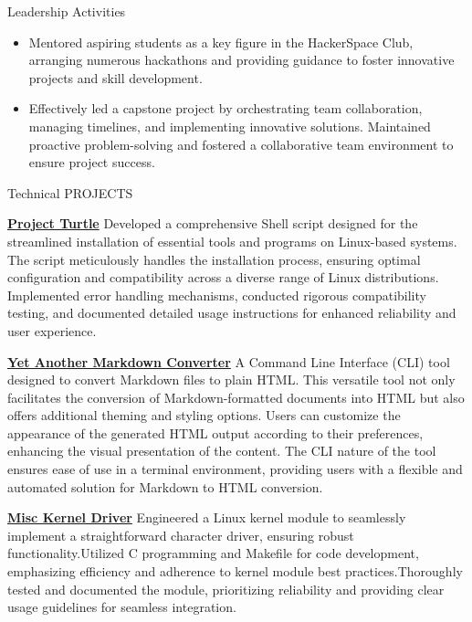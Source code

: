 \documentclass{resume} %
\begin{document}
\begin{rSection}{Leadership Activities} 
\vspace{0.25cm}
\begin{itemize}
    \item Mentored aspiring students as a key figure in the HackerSpace Club, arranging numerous hackathons and providing guidance to foster innovative projects and skill development.
    \item Effectively led a capstone project by orchestrating team collaboration, managing timelines, and implementing innovative solutions. Maintained proactive problem-solving and fostered a collaborative team environment to ensure project success.
\end{itemize}


\end{rSection}
\begin{rSection}{Technical PROJECTS}
\vspace{0.25cm}
\item \textbf{\href{https://github.com/Adarsh-Liju/ProjectTurtle}{Project Turtle}} {Developed a comprehensive Shell script designed for the streamlined installation of essential tools and programs on Linux-based systems. The script meticulously handles the installation process, ensuring optimal configuration and compatibility across a diverse range of Linux distributions. Implemented error handling mechanisms, conducted rigorous compatibility testing, and documented detailed usage instructions for enhanced reliability and user experience.}

\item \textbf{\href{https://github.com/Adarsh-Liju/yamc}{Yet Another Markdown Converter}} {A Command Line Interface (CLI) tool designed to convert Markdown files to plain HTML. This versatile tool not only facilitates the conversion of Markdown-formatted documents into HTML but also offers additional theming and styling options. Users can customize the appearance of the generated HTML output according to their preferences, enhancing the visual presentation of the content. The CLI nature of the tool ensures ease of use in a terminal environment, providing users with a flexible and automated solution for Markdown to HTML conversion.}

\item \textbf{\href{https://github.com/Adarsh-Liju/Misc-Kernel-Driver}{Misc Kernel Driver}} {Engineered a Linux kernel module to seamlessly implement a straightforward character driver, ensuring robust functionality.Utilized C programming and Makefile for code development, emphasizing efficiency and adherence to kernel module best practices.Thoroughly tested and documented the module, prioritizing reliability and providing clear usage guidelines for seamless integration.}


\end{rSection}
\end{document}
